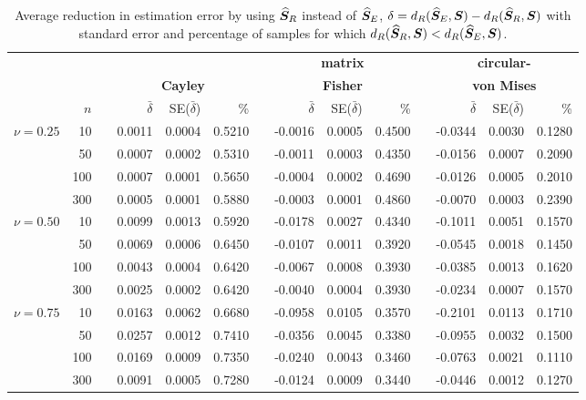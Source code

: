 \begin{table}[h!]
\caption{Average reduction in estimation error by using ${\widehat{\bm S}_R}$ instead of ${\widehat{\bm S}_E}$, $\delta={d_R}({\widehat{\bm S}_E},\bm S) - {d_R}({\widehat{\bm S}_R},\bm S)$ with standard error and percentage of samples for which ${d_R}({\widehat{\bm S}_R},\bm S) < {d_R}({\widehat{\bm S}_E},\bm S)$.  \label{tab:percL2}}
\begin{center}
\begin{tabular}{rrcrrrcrrrcrrr}
  \hline
  & &&\multicolumn{3}{c}{} & &\multicolumn{3}{c}{\textbf{matrix} } &&\multicolumn{3}{c}{\textbf{circular-}}\\
    && &\multicolumn{3}{c}{\textbf{Cayley}} & &\multicolumn{3}{c}{\textbf{Fisher}} & &\multicolumn{3}{c}{\textbf{von Mises}}\\ 
\rule[2mm]{0mm}{3mm} 
  &  $n$ && $\bar{\delta}$&SE($\bar\delta$) & \% & & $\bar{\delta}$&SE($\bar\delta$) & \% & & $\bar{\delta}$&SE($\bar\delta$) & \% \\  
  \hline \hline
\multirow{4}{*}{$\nu=0.25$}
 &    10 && 0.0011 & 0.0004 & 0.5210 && -0.0016 & 0.0005 & 0.4500 && -0.0344 & 0.0030 & 0.1280 \\ 
 &    50 && 0.0007 & 0.0002 & 0.5310 && -0.0011 & 0.0003 & 0.4350 && -0.0156 & 0.0007 & 0.2090 \\ 
 &   100 && 0.0007 & 0.0001 & 0.5650 && -0.0004 & 0.0002 & 0.4690 && -0.0126 & 0.0005 & 0.2010 \\ 
 &   300 && 0.0005 & 0.0001 & 0.5880 && -0.0003 & 0.0001 & 0.4860 && -0.0070 & 0.0003 & 0.2390 \\\hline
  \multirow{4}{*}{$\nu=0.50$}
  &    10 && 0.0099 & 0.0013 & 0.5920 && -0.0178 & 0.0027 & 0.4340 && -0.1011 & 0.0051 & 0.1570 \\ 
  &    50 && 0.0069 & 0.0006 & 0.6450 && -0.0107 & 0.0011 & 0.3920 && -0.0545 & 0.0018 & 0.1450 \\ 
  &   100 && 0.0043 & 0.0004 & 0.6420 && -0.0067 & 0.0008 & 0.3930 && -0.0385 & 0.0013 & 0.1620 \\ 
  &   300 && 0.0025 & 0.0002 & 0.6420 && -0.0040 & 0.0004 & 0.3930 && -0.0234 & 0.0007 & 0.1570 \\ \hline
  \multirow{4}{*}{$\nu=0.75$}
  &    10 && 0.0163 & 0.0062 & 0.6680 && -0.0958 & 0.0105 & 0.3570 && -0.2101 & 0.0113 & 0.1710 \\ 
  &    50 && 0.0257 & 0.0012 & 0.7410 && -0.0356 & 0.0045 & 0.3380 && -0.0955 & 0.0032 & 0.1500 \\ 
  &   100 && 0.0169 & 0.0009 & 0.7350 && -0.0240 & 0.0043 & 0.3460 && -0.0763 & 0.0021 & 0.1110 \\ 
  &   300 && 0.0091 & 0.0005 & 0.7280 && -0.0124 & 0.0009 & 0.3440 && -0.0446 & 0.0012 & 0.1270 \\
   \hline
\end{tabular}
\end{center}
\end{table}


